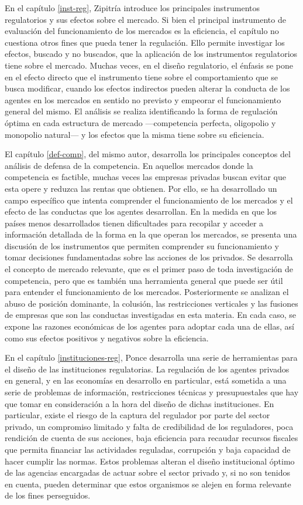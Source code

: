 \documentclass[
  12pt,
  spanish,
]{book}
\begin{document}
En el capítulo \ref{inst-reg}, Zipitría introduce los principales instrumentos regulatorios y sus efectos sobre el mercado. Si bien el principal instrumento de evaluación del funcionamiento de los mercados es la eficiencia, el capítulo no cuestiona otros fines que pueda tener la regulación. Ello permite investigar los efectos, buscado y no buscados, que la aplicación de los instrumentos regulatorios tiene sobre el mercado. Muchas veces, en el diseño regulatorio, el énfasis se pone en el efecto directo que el instrumento tiene sobre el comportamiento que se busca modificar, cuando los efectos indirectos pueden alterar la conducta de los agentes en los mercados en sentido no previsto y empeorar el funcionamiento general del mismo. El análisis se realiza identificando la forma de regulación óptima en cada estructura de mercado ---competencia perfecta, oligopolio y monopolio natural--- y los efectos que la misma tiene sobre su eficiencia.

El capítulo \ref{def-comp}, del mismo autor, desarrolla los principales conceptos del análisis de defensa de la competencia. En aquellos mercados donde la competencia es factible, muchas veces las empresas privadas buscan evitar que esta opere y reduzca las rentas que obtienen. Por ello, se ha desarrollado un campo específico que intenta comprender el funcionamiento de los mercados y el efecto de las conductas que los agentes desarrollan. En la medida en que los países menos desarrollados tienen dificultades para recopilar y acceder a información detallada de la forma en la que operan los mercados, se presenta una discusión de los instrumentos que permiten comprender su funcionamiento y tomar decisiones fundamentadas sobre las acciones de los privados. Se desarrolla el concepto de mercado relevante, que es el primer paso de toda investigación de competencia, pero que es también una herramienta general que puede ser útil para entender el funcionamiento de los mercados. Posteriormente se analizan el abuso de posición dominante, la colusión, las restricciones verticales y las fusiones de empresas que son las conductas investigadas en esta materia. En cada caso, se expone las razones económicas de los agentes para adoptar cada una de ellas, así como sus efectos positivos y negativos sobre la eficiencia.

En el capítulo \ref{instituciones-reg}, Ponce desarrolla una serie de herramientas para el diseño de las instituciones regulatorias. La regulación de los agentes privados en general, y en las economías en desarrollo en particular, está sometida a una serie de problemas de información, restricciones técnicas y presupuestales que hay que tomar en consideración a la hora del diseño de dichas instituciones. En particular, existe el riesgo de la captura del regulador por parte del sector privado, un compromiso limitado y falta de credibilidad de los reguladores, poca rendición de cuenta de sus acciones, baja eficiencia para recaudar recursos fiscales que permita financiar las actividades reguladas, corrupción y baja capacidad de hacer cumplir las normas. Estos problemas alteran el diseño institucional óptimo de las agencias encargadas de actuar sobre el sector privado y, si no son tenidos en cuenta, pueden determinar que estos organismos se alejen en forma relevante de los fines perseguidos.
\end{document}
